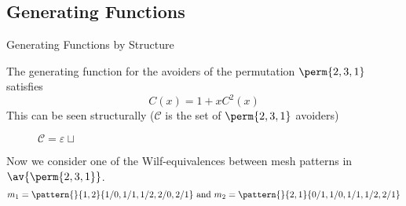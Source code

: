 \subsection{Generating Functions}
\label{sub:Generating Functions}
\begin{frame}{Generating Functions by Structure}
  \begin{example}
  The generating function for the avoiders of the permutation \(\perm{2,3,1}\)
  satisfies
  \begin{equation}
    C(x) = 1 +xC^2(x)
  \end{equation}
  This can be seen structurally (\(\mathcal{C}\) is the set of \(\perm{2,3,1}\) avoiders)
  \begin{figure}[!ht]
    \centering
    \(\mathcal{C} = \varepsilon \mathrel{\sqcup}\) 
\end{figure}
%
\end{example}
\end{frame}
\begin{frame}
  Now we consider one of the Wilf-equivalences between mesh patterns in \(\av{\perm{2,3,1}}\).
  \begin{equation*}
    m_1 = \pattern{}{1,2}{1/0,1/1,1/2,2/0,2/1} \text{ and }
    m_2 = \pattern{}{2,1}{0/1,1/0,1/1,1/2,2/1}
  \end{equation*}
\end{frame}

